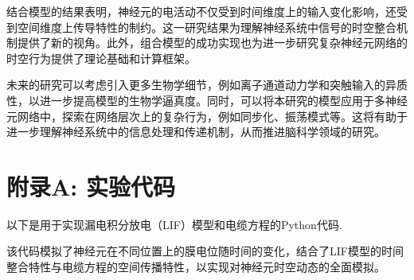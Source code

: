 \documentclass[12pt]{article}
\begin{document}
结合模型的结果表明，神经元的电活动不仅受到时间维度上的输入变化影响，还受到空间维度上传导特性的制约。这一研究结果为理解神经系统中信号的时空整合机制提供了新的视角。此外，组合模型的成功实现也为进一步研究复杂神经元网络的时空行为提供了理论基础和计算框架。

未来的研究可以考虑引入更多生物学细节，例如离子通道动力学和突触输入的异质性，以进一步提高模型的生物学逼真度。同时，可以将本研究的模型应用于多神经元网络中，探索在网络层次上的复杂行为，例如同步化、振荡模式等。这将有助于进一步理解神经系统中的信息处理和传递机制，从而推进脑科学领域的研究。

\section*{附录A: 实验代码}

以下是用于实现漏电积分放电（LIF）模型和电缆方程的Python代码.



该代码模拟了神经元在不同位置上的膜电位随时间的变化，结合了LIF模型的时间整合特性与电缆方程的空间传播特性，以实现对神经元时空动态的全面模拟。
\end{document}
